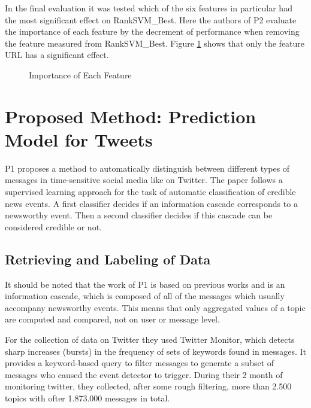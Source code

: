 \documentclass{proseminar}
\begin{document}
In the final evaluation it was tested which of the six features in particular had the most significant effect on RankSVM\_Best. Here the authors of P2 evaluate the importance of each feature by the decrement of performance when removing the feature measured from RankSVM\_Best. 
Figure \ref{fig:p2_resultFeature} shows that only the feature URL has a significant effect.

\begin{figure}[h]
\centering
{}
\caption{Importance of Each Feature}
\label{fig:p2_resultFeature}
\end{figure}



\section{Proposed Method: Prediction\\ Model for Tweets}
P1 proposes a method to automatically distinguish between different types of messages in time-sensitive social media like on Twitter.
The paper follows a supervised learning approach for the task of automatic classification of credible news events. A first classifier decides if an information cascade corresponds to a newsworthy event. Then a second classifier decides if this cascade can be considered credible or not.


\subsection{Retrieving and Labeling of Data}
It should be noted that the work of P1 is based on previous works and is an information cascade, which is composed of all of the messages which usually accompany newsworthy events. This means that only aggregated values of a topic are computed and compared, not on user or message level.

For the collection of data on Twitter they used Twitter Monitor\cite{twittermonitor}, which detects sharp increases (bursts) in the frequency of sets of keywords found in messages. It provides a keyword-based query to filter messages to generate a subset of messages who caused the event detector to trigger.
During their 2 month of monitoring twitter, they collected, after some rough filtering, more than 2.500 topics with ofter 1.873.000 messages in total.
\end{document}
